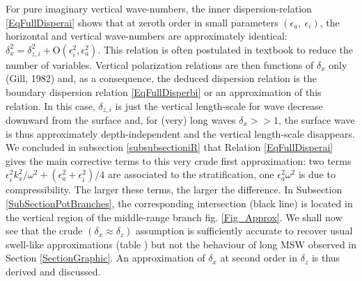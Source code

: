 \documentclass[a4paper,11pt]{article}
\begin{document}

For pure imaginary vertical wave-numbers, the inner dispersion-relation \ref{EqFullDisperai} shows that at zeroth order in small parameters $(\epsilon_a,\ \epsilon_i)$, the horizontal and vertical wave-numbers are approximately identical: $\delta_x^2=\delta_{z,i}^2+\mathrm{O}(\epsilon_i^2,\epsilon_a^2)$. This relation is often postulated in textbook to reduce the number of variables. Vertical polarization relations are then functions of $\delta_x$ only (Gill, 1982) and, as a consequence, the deduced dispersion relation is the boundary dispersion relation \ref{EqFullDisperbi} or an approximation of this relation. In this case, $\delta_{z,i}$ is just the vertical length-scale for wave decrease downward from the surface and, for (very) long waves $\delta_x>>1$, the surface wave is thus approximately depth-independent and the vertical length-scale disappears.\\
We concluded in subsection \ref{subsubsectioniR} that Relation \ref{EqFullDisperai} gives the main corrective terms to this very crude first approximation: two terms  $\epsilon_i^2 k_x^2/\omega^2+(\epsilon_a^2+\epsilon_i^2)/4$ are associated to the stratification, one $\epsilon_a^2\omega^2$ is due to compressibility. The larger these terms, the larger the difference. In Subsection \ref{SubSectionPotBranches}, the corresponding intersection (black line) is located in the vertical region of the middle-range branch fig. \ref{Fig_Approx}. We shall now see that the crude $(\delta_x\approx\delta_z)$ assumption is sufficiently accurate to recover usual swell-like approximations (table ) but not the behaviour of long MSW observed in Section \ref{SectionGraphic}. An approximation of $\delta_x$ at second order in $\delta_z$ is thus derived and discussed. 
\end{document}
